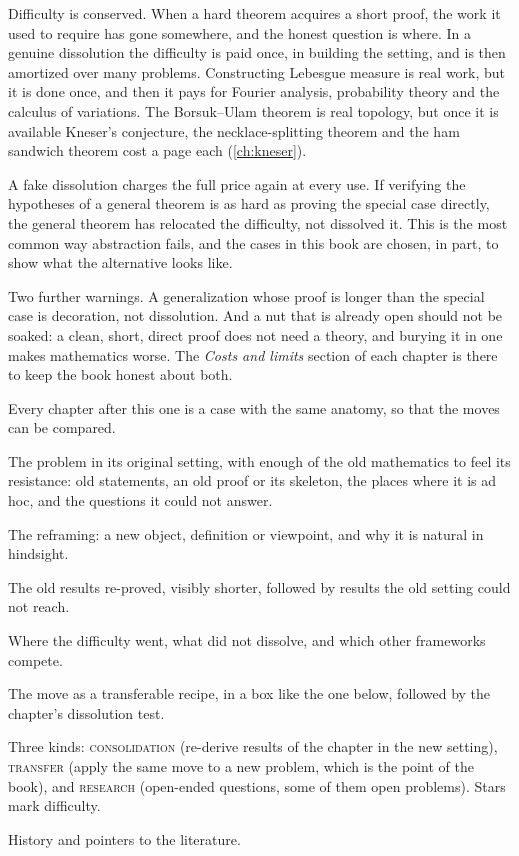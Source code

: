 \begin{refsection}

Difficulty is conserved. When a hard theorem acquires a short proof, the work it used to require has gone somewhere, and the honest question is where. In a genuine dissolution the difficulty is paid once, in building the setting, and is then amortized over many problems. Constructing Lebesgue measure is real work, but it is done once, and then it pays for Fourier analysis, probability theory and the calculus of variations. The Borsuk--Ulam theorem is real topology, but once it is available Kneser's conjecture, the necklace-splitting theorem and the ham sandwich theorem cost a page each (\cref{ch:kneser}).

A fake dissolution charges the full price again at every use. If verifying the hypotheses of a general theorem is as hard as proving the special case directly, the general theorem has relocated the difficulty, not dissolved it. This is the most common way abstraction fails, and the cases in this book are chosen, in part, to show what the alternative looks like.

Two further warnings. A generalization whose proof is longer than the special case is decoration, not dissolution. And a nut that is already open should not be soaked: a clean, short, direct proof does not need a theory, and burying it in one makes mathematics worse. The \emph{Costs and limits} section of each chapter is there to keep the book honest about both.


Every chapter after this one is a case with the same anatomy, so that the moves can be compared.

\begin{description}[leftmargin=1.2em,style=nextline,font=\normalfont\scshape\color{sea}]
\item[Before.] The problem in its original setting, with enough of the old mathematics to feel its resistance: old statements, an old proof or its skeleton, the places where it is ad hoc, and the questions it could not answer.
\item[The move.] The reframing: a new object, definition or viewpoint, and why it is natural in hindsight.
\item[After.] The old results re-proved, visibly shorter, followed by results the old setting could not reach.
\item[Costs and limits.] Where the difficulty went, what did not dissolve, and which other frameworks compete.
\item[The move, distilled.] The move as a transferable recipe, in a box like the one below, followed by the chapter's dissolution test.
\item[Exercises.] Three kinds: \textsc{consolidation} (re-derive results of the chapter in the new setting), \textsc{transfer} (apply the same move to a new problem, which is the point of the book), and \textsc{research} (open-ended questions, some of them open problems). Stars mark difficulty.
\item[Notes and References.] History and pointers to the literature.
\end{description}


\end{refsection}
